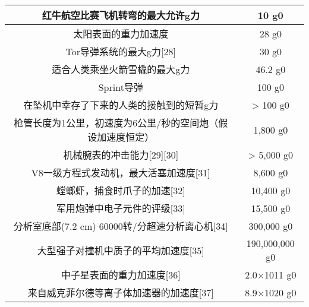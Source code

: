 \begin{table}[ht]
\begin{tabular}{|c|c}
\hline
红牛航空比赛飞机转弯的最大允许g力 & 10 g0 \\
\hline
太阳表面的重力加速度 & 28 g0 \\
\hline
Tor导弹系统的最大g力[28] & 30 g0 \\
\hline
适合人类乘坐火箭雪橇的最大g力 & 46.2 g0 \\
\hline
Sprint导弹 & 100 g0 \\
\hline
在坠机中幸存了下来的人类的接触到的短暂g力 & > 100 g0 \\
\hline
枪管长度为1公里，初速度为6公里/秒的空间炮（假设加速度恒定） & 1,800 g0 \\
\hline
机械腕表的冲击能力[29][30] & > 5,000 g0 \\
\hline
V8一级方程式发动机，最大活塞加速度[31] & 8,600 g0 \\
\hline
螳螂虾，捕食时爪子的加速[32] & 10,400 g0 \\
\hline
军用炮弹中电子元件的评级[33] & 15,500 g0 \\
\hline
分析室底部(7.2 cm) 60000转/分超速分析离心机[34] & 300,000 g0 \\
\hline
大型强子对撞机中质子的平均加速度[35] & 190,000,000 g0 \\
\hline
中子星表面的重力加速度[36] & 2.0×1011 g0 \\
\hline
来自威克菲尔德等离子体加速器的加速度[37] & 8.9×1020 g0 \\
\hline
\end{tabular}
\end{table}